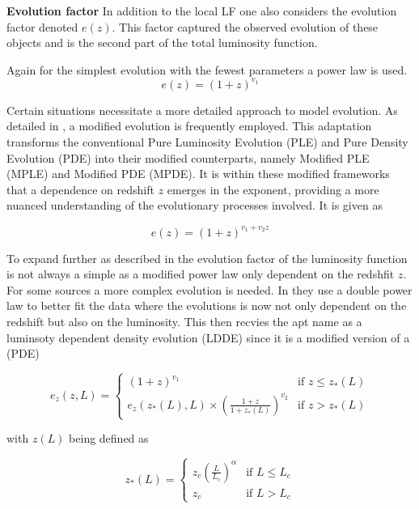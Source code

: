 \documentclass{article}
\begin{document}
\textbf{Evolution factor}
In addition to the local LF one also considers the evolution factor denoted $e(z)$. This factor captured the observed evolution of these objects and is the second part of the total luminosity function.

Again for the simplest evolution with the fewest parameters a power law is used.
 $$
e(z) = (1 + z)^{v_1 }
 $$


  
Certain situations necessitate a more detailed approach to model evolution. 
 As detailed in \cite{Ajello_2009}, a modified evolution is frequently employed. 
 This adaptation transforms the conventional Pure Luminosity Evolution (PLE) and Pure Density Evolution 
 (PDE) into their modified counterparts, namely Modified PLE (MPLE) and Modified PDE (MPDE).
It is within these modified frameworks that a dependence on redshift $z$ emerges in the exponent,
providing a more nuanced understanding of the evolutionary processes involved. It is given as

$$
e(z) = (1 + z)^{v_1 +v_2 z }
 $$



 To expand further as described in \cite{Ueda_2003} the evolution factor of the luminosity function is not always a simple as a modified power law only dependent on the redshfit $z$.
For some sources a more complex evolution is needed. In \cite{Ueda_2003} they use a double power law to better fit the data where 
 the evolutions is now not only dependent on the redshift but also on the luminosity. This then recvies the apt name as a luminsoty dependent density evolution (LDDE) since it is a modified version of a (PDE)


 \begin{equation}
    e_z(z, L) = 
    \begin{cases} 
    (1 + z)^{v_1} & \text{if } z \leq z_*(L) \\
    e_z(z_*(L), L) \times \left( \frac{1 + z}{1 + z_*(L)} \right)^{v_2} & \text{if } z >  z_*(L)
    \end{cases}
 \end{equation}

 with $z(L)$ being defined as

 \begin{equation}
    z_*(L) = 
    \begin{cases} 
    z_c \left( \frac{L}{L_c} \right)^\alpha & \text{if } L \leq L_c \\
    z_c & \text{if } L > L_c 
    \end{cases}
 \end{equation}
\end{document}
